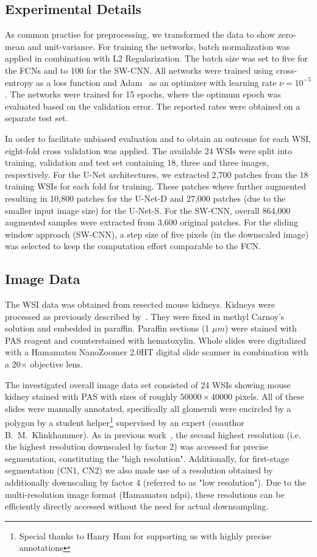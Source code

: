 \documentclass{elsarticle}
\begin{document}
\subsection{Experimental Details}
As common practise for preprocessing, we transformed the data to show zero-mean and unit-variance.
%
For training the networks, batch normalization was applied in combination with L2 Regularization.
The batch size was set to five for the FCNs and to 100 for the SW-CNN.
All networks were trained using cross-entropy as a loss function and Adam~\citep{Kingma2014} as an optimizer with learning rate $\nu = 10^{-5}$.
The networks were trained for 15 epochs, where the optimum epoch was evaluated based on the validation error. The reported rates were obtained on a separate test set.

In order to facilitate unbiased evaluation and to obtain an outcome for each WSI, eight-fold cross validation was applied. The available 24 WSIs were split into training, validation and test set containing 18, three and three images, respectively. 
%
For the U-Net architectures, we extracted 2,700 patches from the 18 training WSIs for each fold for training. These patches where further augmented resulting in 10,800 patches for the U-Net-D and 27,000 patches (due to the smaller input image size) for the U-Net-S.
For the SW-CNN, overall 864,000 augmented samples were extracted from 3,600 original patches.
For the sliding window approach (SW-CNN), a step size of five pixels (in the downscaled image) was selected to keep the computation effort comparable to the FCN.


\subsection{Image Data} \label{sec:imagedata}

The WSI data was obtained from resected mouse kidneys.
Kidneys were processed as previously described by~\cite{myBoor15a}. They were fixed in methyl Carnoy's solution and embedded in paraffin. Paraffin sections (1 $\mu m$) were stained with PAS reagent and counterstained with hematoxylin. Whole slides were digitalized with a Hamamatsu NanoZoomer 2.0HT digital slide scanner in combination with a 20$\times$ objective lens.

The investigated overall image data set consisted of 24 WSIs showing mouse kidney stained with PAS with sizes of roughly $50 000 \times 40 000$ pixels.
All of these slides were manually annotated, specifically all glomeruli were encircled by a polygon by a student helper\footnote{Special thanks to Hanry Ham for supporting us with highly precise annotations} supervised by an expert (coauthor B.~M.~Klinkhammer).
As in previous work~\citep{myKato15a}, the second highest resolution (i.e. the highest resolution downscaled by factor 2) was accessed for precise segmentation, constituting the "high resolution". Additionally, for first-stage segmentation (CN1, CN2) we also made use of a resolution obtained by additionally downscaling by factor 4 (referred to as "low resolution").
Due to the multi-resolution image format (Hamamatsu ndpi), these resolutions can be efficiently directly accessed without the need for actual downsampling.
\end{document}
